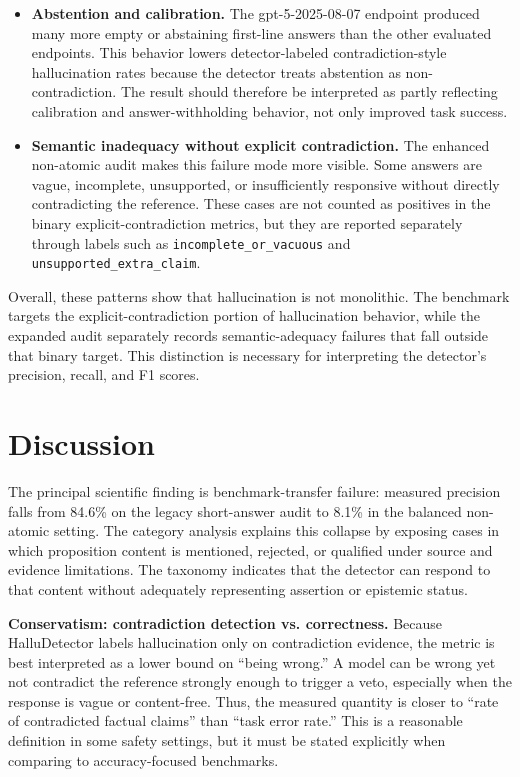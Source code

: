 \documentclass[11pt]{article}
\newcommand{\code}[1]{\texttt{#1}}
\begin{document}
\begin{itemize}[leftmargin=1.5em]
\item \textbf{Abstention and calibration.} The gpt-5-2025-08-07 endpoint produced many more empty or abstaining first-line answers than the other evaluated endpoints. This behavior lowers detector-labeled contradiction-style hallucination rates because the detector treats abstention as non-contradiction. The result should therefore be interpreted as partly reflecting calibration and answer-withholding behavior, not only improved task success.

\item \textbf{Semantic inadequacy without explicit contradiction.} The enhanced non-atomic audit makes this failure mode more visible. Some answers are vague, incomplete, unsupported, or insufficiently responsive without directly contradicting the reference. These cases are not counted as positives in the binary explicit-contradiction metrics, but they are reported separately through labels such as \code{incomplete\_or\_vacuous} and \code{unsupported\_extra\_claim}.
\end{itemize}

Overall, these patterns show that hallucination is not monolithic. The benchmark targets the explicit-contradiction portion of hallucination behavior, while the expanded audit separately records semantic-adequacy failures that fall outside that binary target. This distinction is necessary for interpreting the detector's precision, recall, and F1 scores.

\section*{Discussion}
The principal scientific finding is benchmark-transfer failure: measured precision falls from 84.6\% on the legacy short-answer audit to 8.1\% in the balanced non-atomic setting. The category analysis explains this collapse by exposing cases in which proposition content is mentioned, rejected, or qualified under source and evidence limitations. The taxonomy indicates that the detector can respond to that content without adequately representing assertion or epistemic status.

\textbf{Conservatism: contradiction detection vs. correctness.} Because HalluDetector labels hallucination only on contradiction evidence, the metric is best interpreted as a lower bound on ``being wrong.'' A model can be wrong yet not contradict the reference strongly enough to trigger a veto, especially when the response is vague or content-free. Thus, the measured quantity is closer to ``rate of contradicted factual claims'' than ``task error rate.'' This is a reasonable definition in some safety settings, but it must be stated explicitly when comparing to accuracy-focused benchmarks.
\end{document}
